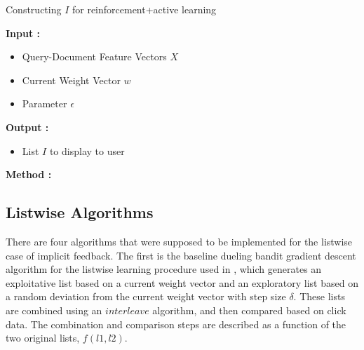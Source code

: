 \documentclass{acm_proc_article-sp}
\begin{document}
\begin{algorithm}[t]
\caption{Constructing $I$ for reinforcement+active learning}
\begin{spacing}{0.9}
\begin{algorithmic}
\STATE \textbf{Input :} \begin{itemize}
\item Query-Document Feature Vectors $X$
\item Current Weight Vector $w$
\item Parameter $\epsilon$
 \end{itemize}
\STATE \textbf{Output :} \begin{itemize}
\item List $I$ to display to user
 \end{itemize}
\STATE \textbf{Method :}
\begin{enumerate}
\ENDWHILE
{}
\end{enumerate}
\end{algorithmic}
\end{spacing}
\label{reinforceActive}
\end{algorithm}


\subsection{Listwise Algorithms}
There are four algorithms that were supposed to be implemented for the listwise case of implicit feedback. The first is the baseline dueling bandit gradient descent algorithm for the listwise learning procedure used in \cite{hofmann}, which generates an exploitative list based on a current weight vector and an exploratory list based on a random deviation from the current weight vector with step size $\delta$.  These lists are combined using an $interleave$ algorithm, and then compared based on click data.  The combination and comparison steps are described as a function of the two original lists, $f(l1,l2)$. \\ \\
\end{document}
